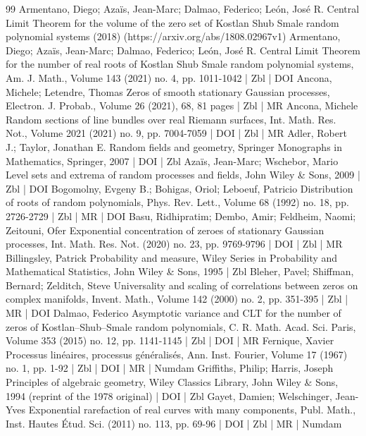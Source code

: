 \begin{thebibliography}{99}
Armentano, Diego; Azaïs, Jean-Marc; Dalmao, Federico; León, José R. Central Limit Theorem for the volume of the zero set of Kostlan Shub Smale random polynomial systems (2018) (https://arxiv.org/abs/1808.02967v1)
Armentano, Diego; Azaïs, Jean-Marc; Dalmao, Federico; León, José R. Central Limit Theorem for the number of real roots of Kostlan Shub Smale random polynomial systems, Am. J. Math., Volume 143 (2021) no. 4, pp. 1011-1042 | Zbl | DOI
Ancona, Michele; Letendre, Thomas Zeros of smooth stationary Gaussian processes, Electron. J. Probab., Volume 26 (2021), 68, 81 pages | Zbl | MR
Ancona, Michele Random sections of line bundles over real Riemann surfaces, Int. Math. Res. Not., Volume 2021 (2021) no. 9, pp. 7004-7059 | DOI | Zbl | MR
Adler, Robert J.; Taylor, Jonathan E. Random fields and geometry, Springer Monographs in Mathematics, Springer, 2007 | DOI | Zbl
Azaïs, Jean-Marc; Wschebor, Mario Level sets and extrema of random processes and fields, John Wiley \& Sons, 2009 | Zbl | DOI
Bogomolny, Evgeny B.; Bohigas, Oriol; Leboeuf, Patricio Distribution of roots of random polynomials, Phys. Rev. Lett., Volume 68 (1992) no. 18, pp. 2726-2729 | Zbl | MR | DOI
Basu, Ridhipratim; Dembo, Amir; Feldheim, Naomi; Zeitouni, Ofer Exponential concentration of zeroes of stationary Gaussian processes, Int. Math. Res. Not. (2020) no. 23, pp. 9769-9796 | DOI | Zbl | MR
Billingsley, Patrick Probability and measure, Wiley Series in Probability and Mathematical Statistics, John Wiley \& Sons, 1995 | Zbl
Bleher, Pavel; Shiffman, Bernard; Zelditch, Steve Universality and scaling of correlations between zeros on complex manifolds, Invent. Math., Volume 142 (2000) no. 2, pp. 351-395 | Zbl | MR | DOI
Dalmao, Federico Asymptotic variance and CLT for the number of zeros of Kostlan–Shub–Smale random polynomials, C. R. Math. Acad. Sci. Paris, Volume 353 (2015) no. 12, pp. 1141-1145 | Zbl | DOI | MR
Fernique, Xavier Processus linéaires, processus généralisés, Ann. Inst. Fourier, Volume 17 (1967) no. 1, pp. 1-92 | Zbl | DOI | MR | Numdam
Griffiths, Philip; Harris, Joseph Principles of algebraic geometry, Wiley Classics Library, John Wiley \& Sons, 1994 (reprint of the 1978 original) | DOI | Zbl
Gayet, Damien; Welschinger, Jean-Yves Exponential rarefaction of real curves with many components, Publ. Math., Inst. Hautes Étud. Sci. (2011) no. 113, pp. 69-96 | DOI | Zbl | MR | Numdam

\end{thebibliography}
